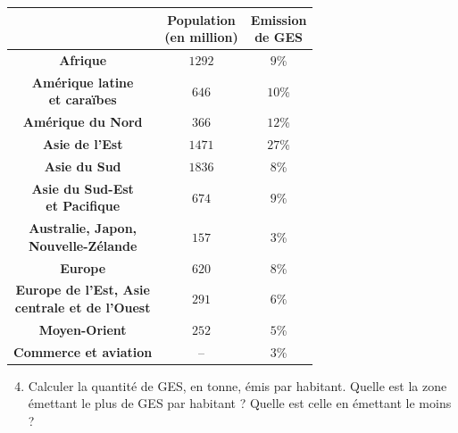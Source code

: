 \documentclass[11pt]{article}
\begin{document}
\begin{minipage}{.55\textwidth}
\begin{center}
  \begin{tabular}[]{ccc}
    \toprule
    & \makecell{\small\textbf{Population}\\\small\textbf{(en million)}} &
    \makecell{\small\textbf{Emission}\\\small\textbf{de GES}}\\\midrule
    \textbf{Afrique} & $1292$ & $9$\%\\
    \makecell{\textbf{Amérique latine}\\\textbf{et caraïbes}} & $646$ & $10$\%
    \\
    \textbf{Amérique du Nord} & $366$ & $12$\% \\
    \textbf{Asie de l'Est} & $1471$ & $27$\% \\
    \textbf{Asie du Sud} & $1836$ & $8$\% \\
    \makecell{\textbf{Asie du Sud-Est}\\\textbf{et Pacifique}} & $674$ & $9\%$
    \\
    \makecell{\textbf{Australie, Japon,}\\\textbf{Nouvelle-Zélande}} & $157$ &
    $3$\%\\
    \textbf{Europe} & $620$ & $8$\% \\
    \makecell{\textbf{Europe de l'Est, Asie}\\\textbf{centrale et de l'Ouest}} &
    $291$ & $6\%$ \\
    \textbf{Moyen-Orient} & $252$ & $5$\% \\
    \textbf{Commerce et aviation} & -- & $3$\%\\
    \bottomrule
  \end{tabular}
\end{center}
\end{minipage}
\begin{enumerate}
    \setcounter{enumi}{3}
  \item Calculer la quantité de GES, en tonne, émis par habitant. Quelle est la
    zone émettant le plus de GES par habitant ? Quelle est celle en émettant le
    moins ?
\end{enumerate}
\end{document}
